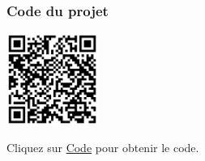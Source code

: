 \documentclass[a4paper,12pt]{report}
\begin{document}
\subsubsection{Code du projet}

\begin{minipage}{0.5\textwidth}
    \includegraphics[height=3cm]{Code TC307.png}
\end{minipage}%
\begin{minipage}{0.5\textwidth}
    Cliquez sur \href{https://github.com/DexterTaha/Controllino-PLC-Sample/blob/main/TC300/TC307_Chauffage/TC307_Chauffage.ino}{Code} pour obtenir le code.
\end{minipage}

\newpage
\end{document}
